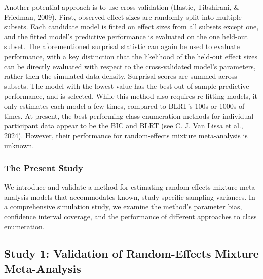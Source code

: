 \documentclass[
  english,
  man, noextraspace,floatsintext]{apa6}
\begin{document}
Another potential approach is to use cross-validation (Hastie, Tibshirani, \& Friedman, 2009).
First, observed effect sizes are randomly split into multiple subsets.
Each candidate model is fitted on effect sizes from all subsets except one, and the fitted model's predictive performance is evaluated on the one held-out subset.
The aforementioned surprisal statistic can again be used to evaluate performance, with a key distinction that the likelihood of the held-out effect sizes can be directly evaluated with respect to the cross-validated model's parameters, rather then the simulated data density.
Surprisal scores are summed across subsets.
The model with the lowest value has the best out-of-sample predictive performance, and is selected.
While this method also requires re-fitting models, it only estimates each model a few times, compared to BLRT's 100s or 1000s of times.
At present, the best-performing class enumeration methods for individual participant data appear to be the BIC and BLRT (see C. J. Van Lissa et al., 2024).
However, their performance for random-effects mixture meta-analysis is unknown.

\subsubsection{The Present Study}\label{the-present-study}

We introduce and validate a method for estimating random-effects mixture meta-analysis models that accommodates known, study-specific sampling variances.
In a comprehensive simulation study, we examine the method's parameter bias, confidence interval coverage, and the performance of different approaches to class enumeration.

\subsection{Study 1: Validation of Random-Effects Mixture Meta-Analysis}\label{study-1-validation-of-random-effects-mixture-meta-analysis}
\end{document}
